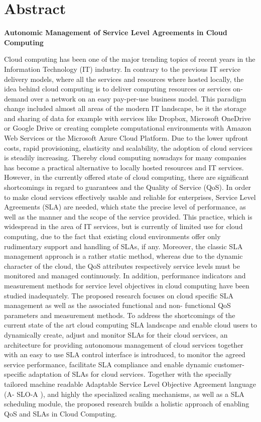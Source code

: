\chapter*{Abstract}
\begin{DoubleSpace}
\textbf{Autonomic Management of Service Level Agreements in Cloud Computing}

Cloud computing has been one of the major trending topics of recent years in the Information Technology (IT) industry. In contrary to the previous IT service delivery models, where all the services and resources where hosted locally, the idea behind cloud computing is to deliver computing resources or services on-demand over a network on an easy pay-per-use business model. This paradigm change included almost all areas of the modern IT landscape, be it the storage and sharing of data for example with services like Dropbox, Microsoft OneDrive or Google Drive or creating complete computational environments with Amazon Web Services or the Microsoft Azure Cloud Platform. Due to the lower upfront costs, rapid provisioning, elasticity and scalability, the adoption of cloud services is steadily increasing. Thereby cloud computing nowadays for many companies has become a practical alternative to locally hosted resources and IT services. However, in the currently offered state of cloud computing, there are significant shortcomings in regard to guarantees and the Quality of Service (QoS). In order to make cloud services effectively usable and reliable for enterprises, Service Level Agreements (SLA) are needed, which state the precise level of performance, as well as the manner and the scope of the service provided. This practice, which is widespread in the area of IT services, but is currently of limited use for cloud computing, due to the fact that existing cloud environments offer only rudimentary support and handling of SLAs, if any. Moreover, the classic SLA management approach is a rather static method, whereas due to the dynamic character of the cloud, the QoS attributes respectively service levels must be monitored and managed continuously. In addition, performance indicators and measurement methods for service level objectives in cloud computing have been studied inadequately. The proposed research focuses on cloud specific SLA management as well as the associated functional and non- functional QoS parameters and measurement methods. To address the shortcomings of the current state of the art cloud computing SLA landscape and enable cloud users to dynamically create, adjust and monitor SLAs for their cloud services, an architecture for providing autonomous management of cloud services together with an easy to use SLA control interface is introduced, to monitor the agreed service performance, facilitate SLA compliance and enable dynamic customer- specific adaptation of SLAs for cloud services. Together with the specially tailored machine readable Adaptable Service Level Objective Agreement language (A- SLO-A ), and highly the specialized scaling mechanisms, as well as a SLA scheduling module, the proposed research builds a holistic approach of enabling QoS and SLAs in Cloud Computing.
\end{DoubleSpace}
\clearpage



